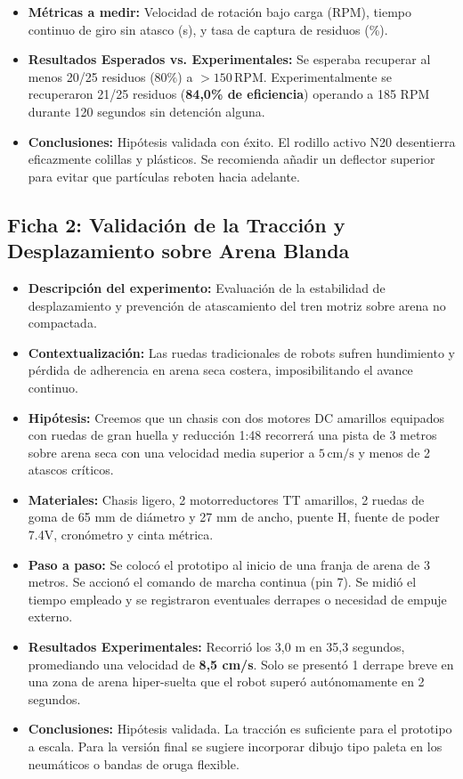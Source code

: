 \documentclass[12pt,letterpaper]{article}
\begin{document}
\begin{itemize}[leftmargin=*, noitemsep]
    \item \textbf{Métricas a medir:} Velocidad de rotación bajo carga (RPM), tiempo continuo de giro sin atasco (s), y tasa de captura de residuos (\%).
    \item \textbf{Resultados Esperados vs. Experimentales:} Se esperaba recuperar al menos 20/25 residuos ($80\%$) a $>150\,\text{RPM}$. Experimentalmente se recuperaron 21/25 residuos (\textbf{84,0\% de eficiencia}) operando a 185 RPM durante 120 segundos sin detención alguna.
    \item \textbf{Conclusiones:} Hipótesis validada con éxito. El rodillo activo N20 desentierra eficazmente colillas y plásticos. Se recomienda añadir un deflector superior para evitar que partículas reboten hacia adelante.
\end{itemize}

\subsection{Ficha 2: Validación de la Tracción y Desplazamiento sobre Arena Blanda}
\begin{itemize}[leftmargin=*, noitemsep]
    \item \textbf{Descripción del experimento:} Evaluación de la estabilidad de desplazamiento y prevención de atascamiento del tren motriz sobre arena no compactada.
    \item \textbf{Contextualización:} Las ruedas tradicionales de robots sufren hundimiento y pérdida de adherencia en arena seca costera, imposibilitando el avance continuo.
    \item \textbf{Hipótesis:} Creemos que un chasis con dos motores DC amarillos equipados con ruedas de gran huella y reducción 1:48 recorrerá una pista de 3 metros sobre arena seca con una velocidad media superior a $5\,\text{cm/s}$ y menos de 2 atascos críticos.
    \item \textbf{Materiales:} Chasis ligero, 2 motorreductores TT amarillos, 2 ruedas de goma de 65 mm de diámetro y 27 mm de ancho, puente H, fuente de poder 7.4V, cronómetro y cinta métrica.
    \item \textbf{Paso a paso:} Se colocó el prototipo al inicio de una franja de arena de 3 metros. Se accionó el comando de marcha continua (pin 7). Se midió el tiempo empleado y se registraron eventuales derrapes o necesidad de empuje externo.
    \item \textbf{Resultados Experimentales:} Recorrió los 3,0 m en 35,3 segundos, promediando una velocidad de \textbf{8,5 cm/s}. Solo se presentó 1 derrape breve en una zona de arena hiper-suelta que el robot superó autónomamente en 2 segundos.
    \item \textbf{Conclusiones:} Hipótesis validada. La tracción es suficiente para el prototipo a escala. Para la versión final se sugiere incorporar dibujo tipo paleta en los neumáticos o bandas de oruga flexible.
\end{itemize}
\end{document}
